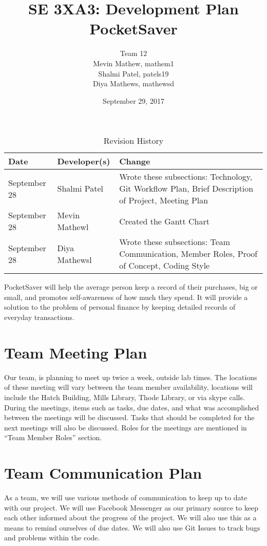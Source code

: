 \documentclass{article}
\title{SE 3XA3: Development Plan\\PocketSaver}
\author{Team 12
		\\ Mevin Mathew, mathem1
		\\ Shalmi Patel, patels19
		\\ Diya Mathews, mathewsd
}
\date{September 29, 2017}
\begin{document}
\begin{table}[hp]
\caption{Revision History} \label{TblRevisionHistory}
\begin{tabularx}{\textwidth}{llX}
\toprule
\textbf{Date} & \textbf{Developer(s)} & \textbf{Change}\\
\midrule
September 28 & Shalmi Patel & Wrote these subsections: Technology, Git Workflow Plan, Brief Description of Project, Meeting Plan\\
September 28 & Mevin Mathewl & Created the Gantt Chart\\
September 28 & Diya Mathewsl & Wrote these subsections: Team Communication, Member Roles, Proof of Concept, Coding Style\\
\bottomrule
\end{tabularx}
\end{table}

\newpage

\maketitle

PocketSaver will help the average person keep a record of their purchases, big or small, and promotes self-awareness of how much they spend. It will provide a solution to the problem of personal finance by keeping detailed records of everyday transactions.

\section{Team Meeting Plan}
Our team, is planning to meet up twice a week, outside lab times. The locations of these meeting will vary between the team member availability, locations will include the Hatch Building, Mills Library, Thode Library, or via skype calls. During the meetings, items such as tasks, due dates, and what was accomplished between the meetings will be discussed. Tasks that should be completed for the next meetings will also be discussed. Roles for the meetings are mentioned in “Team Member Roles” section.

\section{Team Communication Plan}
As a team, we will use various methods of communication to keep up to date with our project. We will use Facebook Messenger as our primary source to keep each other informed about the progress of the project. We will also use this as a means to remind ourselves of due dates. We will also use Git Issues to track bugs and problems within the code.
\end{document}
